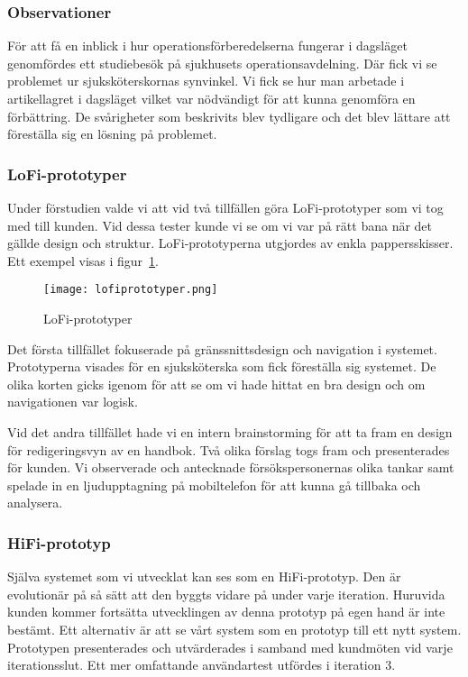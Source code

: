 
\subsubsection{Observationer}
För att få en inblick i hur operationsförberedelserna fungerar i dagsläget genomfördes ett studiebesök på sjukhusets operationsavdelning. Där fick vi se problemet ur sjuksköterskornas synvinkel. Vi fick se hur man arbetade i artikellagret i dagsläget vilket var nödvändigt för att kunna genomföra en förbättring. De svårigheter som beskrivits blev tydligare och det blev lättare att föreställa sig en lösning på problemet.

\subsubsection{LoFi-prototyper}
Under förstudien valde vi att vid två tillfällen göra LoFi-prototyper som vi tog med till kunden. Vid dessa tester kunde vi se om vi var på rätt bana när det gällde design och struktur. LoFi-prototyperna utgjordes av enkla pappersskisser. Ett exempel visas i figur~\ref{fig:lofiprototyper}.
\begin{figure}[htbp]
\begin{center}
\texttt{[image: lofiprototyper.png]}
\caption{LoFi-prototyper}
\label{fig:lofiprototyper}
\end{center}
\end{figure}

Det första tillfället fokuserade på gränssnittsdesign och navigation i systemet. Prototyperna visades för en sjuksköterska som fick föreställa sig systemet. De olika korten gicks igenom för att se om vi hade hittat en bra design och om navigationen var logisk.

Vid det andra tillfället hade vi en intern brainstorming för att ta fram en design för redigeringsvyn av en handbok. Två olika förslag togs fram och presenterades för kunden. Vi observerade och antecknade försökspersonernas olika tankar samt spelade in en ljudupptagning på mobiltelefon för att kunna gå tillbaka och analysera.
\subsubsection{HiFi-prototyp}
Själva systemet som vi utvecklat kan ses som en HiFi-prototyp. Den är evolutionär på så sätt att den byggts vidare på under varje iteration. Huruvida kunden kommer fortsätta utvecklingen av denna prototyp på egen hand är inte bestämt. Ett alternativ är att se vårt system som en prototyp till ett nytt system. 
Prototypen presenterades och utvärderades i samband med kundmöten vid varje iterationsslut. Ett mer omfattande användartest utfördes i iteration 3.


